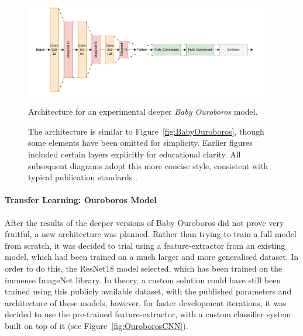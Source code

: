                 \begin{figure}[h]
                    \centering
                    \includegraphics[width=0.95\textwidth]{images/DeepCNN.pdf}
                    \caption{Architecture for an experimental deeper \textit{Baby Ouroboros} model.}
                    \label{fig:DeepCNN}
                    \caption*{
                        The architecture is similar to Figure~\ref{fig:BabyOuroboros}, though some elements have been omitted for simplicity. Earlier figures included certain layers explicitly for educational clarity. All subsequent diagrams adopt this more concise style, consistent with typical publication standards \cite{resnet}.
                    }
                \end{figure}
    
                \paragraph{Transfer Learning: Ouroboros Model}
    
                After the results of the deeper versions of Baby Ouroboros did not prove very fruitful, a new architecture was planned. Rather than trying to train a full model from scratch, it was decided to trial using a feature-extractor from an existing model, which had been trained on a much larger and more generalised dataset. In order to do this, the ResNet18 model selected, which has been trained on the immense ImageNet library. In theory, a custom solution could have still been trained using this publicly available dataset, with the published parameters and architecture of these models, however, for faster development iterations, it was decided to use the pre-trained feature-extractor, with a custom classifier system built on top of it (see Figure~\ref{fig:OuroborosCNN}).
    
